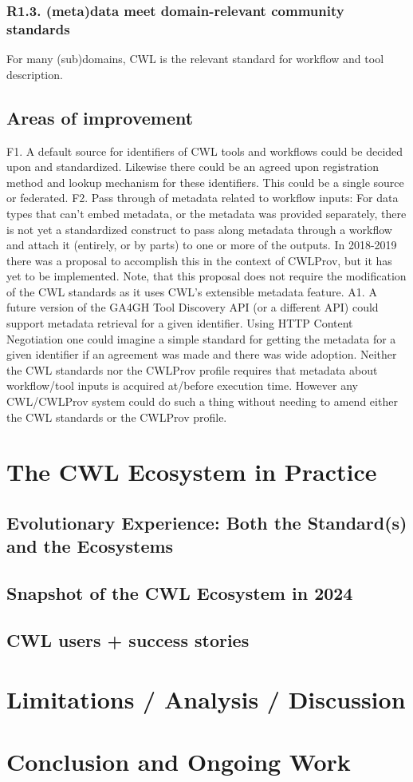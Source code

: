 \subsubsection{R1.3. (meta)data meet domain-relevant community standards}
For many (sub)domains, CWL is the relevant standard for workflow and tool description.
\subsection{Areas of improvement}
F1. A default source for identifiers of CWL tools and workflows could be decided upon and standardized. Likewise there could be an agreed upon registration method and lookup mechanism for these identifiers. This could be a single source or federated.
F2. Pass through of metadata related to workflow inputs: For data types that can’t embed metadata, or the metadata was provided separately, there is not yet a standardized construct to pass along metadata through a workflow and attach it (entirely, or by parts) to one or more of the outputs.  In 2018-2019 there was a proposal to accomplish this in the context of CWLProv, but it has yet to be implemented. Note, that this proposal does not require the modification of the CWL standards as it uses CWL’s extensible metadata feature.
A1. A future version of the GA4GH Tool Discovery API (or a different API) could support metadata retrieval for a given identifier. Using HTTP Content Negotiation one could imagine a simple standard for getting the metadata for a given identifier if an agreement was made and there was wide adoption.
Neither the CWL standards nor the CWLProv profile requires that metadata about workflow/tool inputs is acquired at/before execution time. However any CWL/CWLProv system could do such a thing without needing to amend either the CWL standards or the CWLProv profile.
\section{The CWL Ecosystem in Practice}
\subsection{Evolutionary Experience: Both the Standard(s) and the Ecosystems}
\subsection{Snapshot of the CWL Ecosystem in 2024}
\subsection{CWL users + success stories}

\section{Limitations / Analysis / Discussion}

\section{Conclusion and Ongoing Work}





